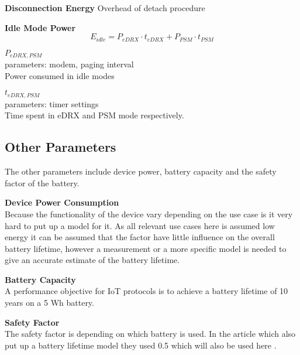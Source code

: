 \textbf{Disconnection Energy}
Overhead of detach procedure

\textbf{Idle Mode Power}
\begin{equation}
E_{idle} = P_{eDRX}\cdot t_{eDRX}+P_{PSM}\cdot t_{PSM}
\end{equation}

$P_{eDRX,PSM}$\\
parameters: modem, paging interval\\
Power consumed in idle modes

$t_{eDRX,PSM}$\\
parameters: timer settings\\
Time spent in eDRX and PSM mode respectively.


\subsection{Other Parameters}
The other parameters include device power, battery capacity and the safety factor of the battery.

\textbf{Device Power Consumption}\\
Because the functionality of the device vary depending on the use case is it very hard to put up a model for it. As all relevant use cases here is assumed low energy it can be assumed that the factor have little influence on the overall battery lifetime, however a measurement or a more specific model is needed to give an accurate estimate of the battery lifetime.

\textbf{Battery Capacity}\\
A performance objective for IoT protocols is to achieve a battery lifetime of 10 years on a 5 Wh battery. 

\textbf{Safety Factor}\\
The safety factor is depending on which battery is used. In the article which also put up a battery lifetime model they used 0.5 which will also be used here \citep{Power_article}.





